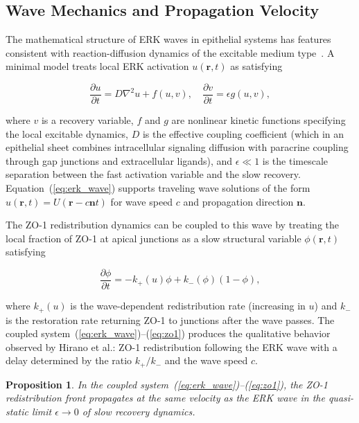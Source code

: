 \documentclass[11pt,a4paper]{article}
\theoremstyle{plain}
\newtheorem{proposition}[theorem]{Proposition}
\theoremstyle{definition}
\begin{document}
\subsection{Wave Mechanics and Propagation Velocity}

The mathematical structure of ERK waves in epithelial systems has features consistent
with reaction-diffusion dynamics of the excitable medium type~\cite{Murray2003}. A
minimal model treats local ERK activation $u(\mathbf{r}, t)$ as satisfying

\begin{equation}
\frac{\partial u}{\partial t} = D \nabla^2 u + f(u, v),
\quad
\frac{\partial v}{\partial t} = \epsilon g(u, v),
\label{eq:erk_wave}
\end{equation}

where $v$ is a recovery variable, $f$ and $g$ are nonlinear kinetic functions
specifying the local excitable dynamics, $D$ is the effective coupling coefficient
(which in an epithelial sheet combines intracellular signaling diffusion with
paracrine coupling through gap junctions and extracellular ligands), and $\epsilon \ll 1$
is the timescale separation between the fast activation variable and the slow recovery.
Equation~(\ref{eq:erk_wave}) supports traveling wave solutions of the form
$u(\mathbf{r}, t) = U(\mathbf{r} - c\mathbf{n} t)$ for wave speed $c$ and propagation
direction $\mathbf{n}$.

The ZO-1 redistribution dynamics can be coupled to this wave by treating the local
fraction of ZO-1 at apical junctions as a slow structural variable $\phi(\mathbf{r}, t)$
satisfying

\begin{equation}
\frac{\partial \phi}{\partial t} = -k_+(u)\phi + k_-(\phi)(1-\phi),
\label{eq:zo1}
\end{equation}

where $k_+(u)$ is the wave-dependent redistribution rate (increasing in $u$) and $k_-$
is the restoration rate returning ZO-1 to junctions after the wave passes. The coupled
system~(\ref{eq:erk_wave})--(\ref{eq:zo1}) produces the qualitative behavior observed
by Hirano et al.: ZO-1 redistribution following the ERK wave with a delay determined
by the ratio $k_+/k_-$ and the wave speed $c$.

\begin{proposition}
In the coupled system~(\ref{eq:erk_wave})--(\ref{eq:zo1}), the ZO-1 redistribution
front propagates at the same velocity as the ERK wave in the quasi-static limit
$\epsilon \to 0$ of slow recovery dynamics.
\end{proposition}
\end{document}
